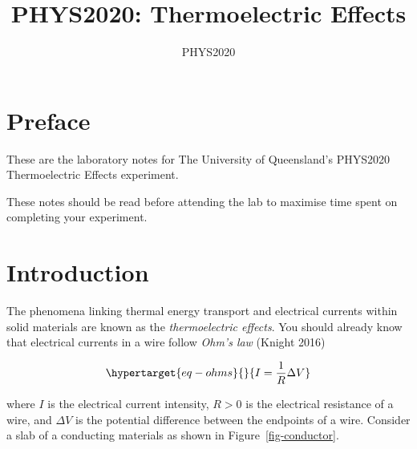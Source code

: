 \documentclass[
  letterpaper,
  DIV=11,
  numbers=noendperiod]{scrreprt}
\title{PHYS2020: Thermoelectric Effects}
\author{PHYS2020}
\date{}
\begin{document}
\maketitle
\ifdefined\Shaded\renewenvironment{Shaded}{\begin{tcolorbox}[enhanced, boxrule=0pt, borderline west={3pt}{0pt}{shadecolor}, sharp corners, breakable, frame hidden, interior hidden]}{\end{tcolorbox}}\fi


\hypertarget{preface}{%
\chapter*{Preface}\label{preface}}


These are the laboratory notes for The University of Queensland's
PHYS2020 Thermoelectric Effects experiment.

These notes should be read before attending the lab to maximise time
spent on completing your experiment.


\hypertarget{introduction}{%
\chapter{Introduction}\label{introduction}}

The phenomena linking thermal energy transport and electrical currents
within solid materials are known as the \emph{thermoelectric effects}.
You should already know that electrical currents in a wire follow
\emph{Ohm's law} (Knight 2016)

\begin{equation}\protect\hypertarget{eq-ohms}{}{I = \frac{1}{R}\Delta V}\label{eq-ohms}\end{equation}

where \(I\) is the electrical current intensity, \(R > 0\) is the
electrical resistance of a wire, and \(\Delta V\) is the potential
difference between the endpoints of a wire. Consider a slab of a
conducting materials as shown in Figure~\ref{fig-conductor}.
\end{document}
